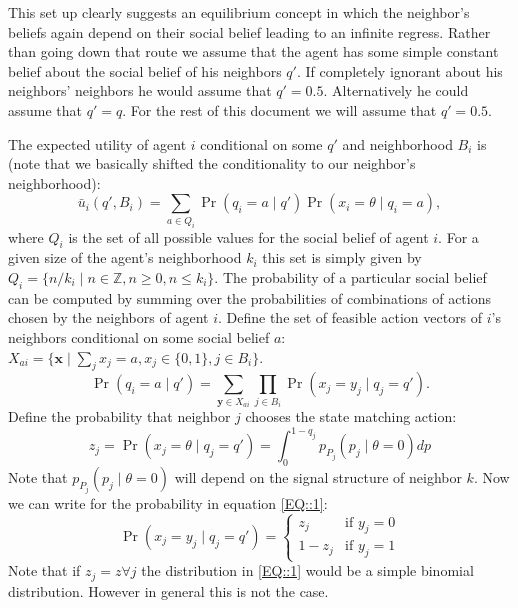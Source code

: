 \documentclass[10pt,a4paper]{article}
\begin{document}
This set up clearly suggests an equilibrium concept in which the neighbor's beliefs again depend on their social belief leading to an infinite regress. Rather than going down that route we assume that the agent has some simple constant belief about the social belief of his neighbors $q'$. If completely ignorant about his neighbors' neighbors he would assume that $q'=0.5$. Alternatively he could assume that $q'=q$. For the rest of this document we will assume that $q'=0.5$.

The expected utility of agent $i$ conditional on some $q'$ and neighborhood $B_i$ is (note that we basically shifted the conditionality to our neighbor's neighborhood):
\begin{equation}
\bar{u}_i(q',B_i) = \sum_{a \in Q_i} \Pr(q_i = a \mid q') \Pr(x_i = \theta \mid q_i = a),
\end{equation}
where $Q_i$ is the set of all possible values for the social belief of agent $i$. For a given size of the agent's neighborhood $k_i$ this set is simply given by $Q_i = \{n/k_i \mid n \in \mathbb{Z}, n \geq 0, n \leq k_i \}$. The probability of a particular social belief can be computed by summing over the probabilities of combinations of actions chosen by the neighbors of agent $i$. Define the set of feasible action vectors of $i$'s neighbors conditional on some social belief $a$: $X_{ai} = \{\mathbf{x} \mid \sum_j x_j = a, x_j \in \{0,1\}, j\in B_i\}$.
\begin{equation}
\label{EQ::1}
\Pr(q_i = a \mid q') = \sum_{\mathbf{y} \in  X_{ai}} \prod_{j \in B_i} \Pr(x_j = y_j \mid q_j = q').
\end{equation}
Define the probability that neighbor $j$ chooses the state matching action:
\begin{equation}
z_j = \Pr(x_j = \theta \mid q_j = q') = \int_0^{1-q_j} p_{P_j}(p_j \mid \theta = 0) dp
\end{equation}
Note that $p_{P_j}(p_j \mid \theta = 0)$ will depend on the signal structure of neighbor $k$. Now we can write for the probability in equation \ref{EQ::1}:
\begin{equation}
\Pr(x_j = y_j \mid q_j = q') = \begin{cases} z_j &\mbox{if } y_j = 0  \\
1-z_j & \mbox{if } y_j = 1 \end{cases}
\end{equation}
Note that if $z_j = z \forall j$ the distribution in \ref{EQ::1} would be a simple binomial distribution. However in general this is not the case.
\end{document}
